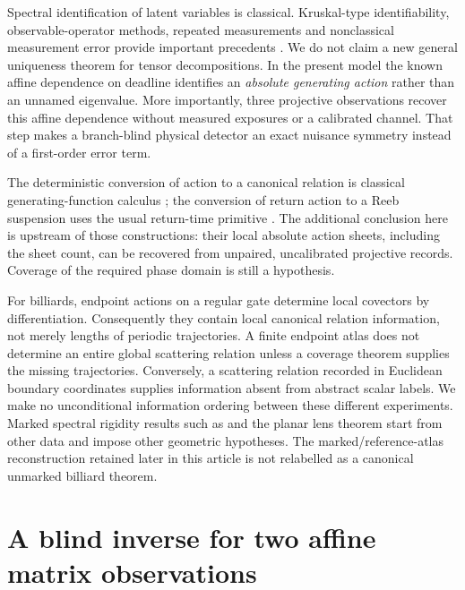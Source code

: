 Spectral identification of latent variables is classical.  Kruskal-type
identifiability, observable-operator methods, repeated measurements and
nonclassical measurement error provide important precedents
\cite{V81AllmanMatiasRhodes,V81AnandkumarHsuKakade,V81BonhommeJochmansRobin,
V81HuSchennach}.  We do not claim a new general uniqueness theorem for
tensor decompositions.  In the present model the known affine dependence
on deadline identifies an \emph{absolute generating action} rather than
an unnamed eigenvalue.  More importantly, three projective observations
recover this affine dependence without measured exposures or a calibrated
channel.  That step makes a branch-blind physical detector an exact
nuisance symmetry instead of a first-order error term.

The deterministic conversion of action to a canonical relation is
classical generating-function calculus
\cite{MarsdenWest2001,LallWest2006}; the conversion of return action to a
Reeb suspension uses the usual return-time primitive
\cite{Hutchings2016,V81Geiges2008}.  The additional conclusion here is upstream of
those constructions: their local absolute action sheets, including the
sheet count, can be recovered from unpaired, uncalibrated projective
records.  Coverage of the required phase domain is still a hypothesis.

For billiards, endpoint actions on a regular gate determine local
covectors by differentiation.  Consequently they contain local canonical
relation information, not merely lengths of periodic trajectories.
A finite endpoint atlas does not determine an entire global scattering
relation unless a coverage theorem supplies the missing trajectories.
Conversely, a scattering relation recorded in Euclidean boundary
coordinates supplies information absent from abstract scalar labels.
We make no unconditional information ordering between these different
experiments.  Marked spectral rigidity results such as
\cite{FinamoreLeguil,DeSimoiKaloshinLeguil2023} and the planar lens theorem
\cite{NoakesStoyanov2020} start from other data and impose other geometric
hypotheses.  The marked/reference-atlas reconstruction retained later in
this article is not relabelled as a canonical unmarked billiard theorem.

\section{A blind inverse for two affine matrix observations}
\label{sec:v81-affine}

